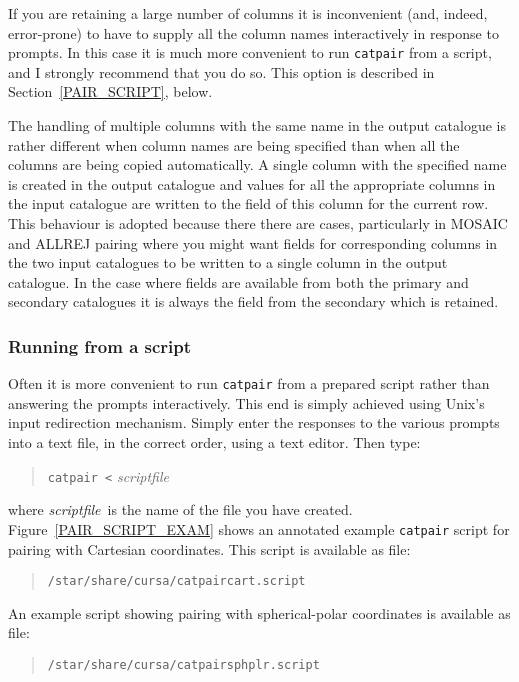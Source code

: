 \documentclass[twoside,11pt]{article}
\renewcommand{\_}{\texttt{\symbol{95}}}
\begin{document}
If you are retaining a large number of columns it is inconvenient (and,
indeed, error-prone) to have to supply all the column names interactively
in response to prompts. In this case it is much more  convenient to run
{\tt catpair} from a script, and I strongly recommend that you do so. This
option is described in Section~\ref{PAIR_SCRIPT}, below.

The handling of multiple columns with the same name in the output catalogue
is rather different when column names are being specified than when all the
columns are being copied automatically. A single column with the specified
name is created in the output catalogue and values for all the appropriate
columns in the input catalogue are written to the field of this column
for the current row. This behaviour is adopted because there there are
cases, particularly in MOSAIC and ALLREJ pairing where you might want
fields for corresponding columns in the two input catalogues to be
written to a single column in the output catalogue. In the case where
fields are available from both the primary and secondary catalogues it is
always the field from the secondary which is retained.

\subsubsection{\label{PAIR_SCRIPT}Running from a script}

Often it is more convenient to run {\tt catpair} from a prepared script
rather than answering the prompts interactively. This end is simply
achieved using Unix's input redirection mechanism. Simply enter the
responses to the various prompts into a text file, in the correct order,
using a text editor. Then type:

\begin{verse}
{\tt catpair  <} {\it script\_file}
\end{verse}

where {\it script\_file}\, is the name of the file you have created.
Figure~\ref{PAIR_SCRIPT_EXAM} shows an annotated example {\tt catpair} 
script for pairing with Cartesian coordinates.  This script is available
as file:

\begin{verse}
{\tt /star/share/cursa/catpair\_cart.script}
\end{verse}

An example script showing pairing with spherical-polar coordinates is
available as file:

\begin{verse}
{\tt /star/share/cursa/catpair\_sphplr.script}
\end{verse}
\end{document}
